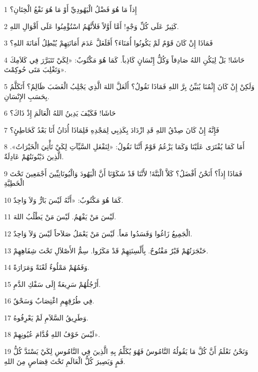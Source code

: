 \par 1 إِذاً مَا هُوَ فَضْلُ الْيَهُودِيِّ أَوْ مَا هُوَ نَفْعُ الْخِتَانِ؟
\par 2 كَثِيرٌ عَلَى كُلِّ وَجْهٍ! أَمَّا أَوَّلاً فَلأَنَّهُمُ اسْتُؤْمِنُوا عَلَى أَقْوَالِ اللهِ.
\par 3 فَمَاذَا إِنْ كَانَ قَوْمٌ لَمْ يَكُونُوا أُمَنَاءَ؟ أَفَلَعَلَّ عَدَمَ أَمَانَتِهِمْ يُبْطِلُ أَمَانَةَ اللهِ؟
\par 4 حَاشَا! بَلْ لِيَكُنِ اللهُ صَادِقاً وَكُلُّ إِنْسَانٍ كَاذِباً. كَمَا هُوَ مَكْتُوبٌ: «لِكَيْ تَتَبَرَّرَ فِي كَلاَمِكَ وَتَغْلِبَ مَتَى حُوكِمْتَ».
\par 5 وَلَكِنْ إِنْ كَانَ إِثْمُنَا يُبَيِّنُ بِرَّ اللهِ فَمَاذَا نَقُولُ؟ أَلَعَلَّ اللهَ الَّذِي يَجْلِبُ الْغَضَبَ ظَالِمٌ؟ أَتَكَلَّمُ بِحَسَبِ الإِنْسَانِ.
\par 6 حَاشَا! فَكَيْفَ يَدِينُ اللهُ الْعَالَمَ إِذْ ذَاكَ؟
\par 7 فَإِنَّهُ إِنْ كَانَ صِدْقُ اللهِ قَدِ ازْدَادَ بِكَذِبِي لِمَجْدِهِ فَلِمَاذَا أُدَانُ أَنَا بَعْدُ كَخَاطِئٍ؟
\par 8 أَمَا كَمَا يُفْتَرَى عَلَيْنَا وَكَمَا يَزْعُمُ قَوْمٌ أَنَّنَا نَقُولُ: «لِنَفْعَلِ السَّيِّآتِ لِكَيْ تَأْتِيَ الْخَيْرَاتُ». الَّذِينَ دَيْنُونَتُهُمْ عَادِلَةٌ.
\par 9 فَمَاذَا إِذاً؟ أَنَحْنُ أَفْضَلُ؟ كَلاَّ الْبَتَّةَ! لأَنَّنَا قَدْ شَكَوْنَا أَنَّ الْيَهُودَ وَالْيُونَانِيِّينَ أَجْمَعِينَ تَحْتَ الْخَطِيَّةِ
\par 10 كَمَا هُوَ مَكْتُوبٌ: «أَنَّهُ لَيْسَ بَارٌّ وَلاَ وَاحِدٌ.
\par 11 لَيْسَ مَنْ يَفْهَمُ. لَيْسَ مَنْ يَطْلُبُ اللهَ.
\par 12 الْجَمِيعُ زَاغُوا وَفَسَدُوا مَعاً. لَيْسَ مَنْ يَعْمَلُ صَلاَحاً لَيْسَ وَلاَ وَاحِدٌ.
\par 13 حَنْجَرَتُهُمْ قَبْرٌ مَفْتُوحٌ. بِأَلْسِنَتِهِمْ قَدْ مَكَرُوا. سِمُّ الأَصْلاَلِ تَحْتَ شِفَاهِهِمْ.
\par 14 وَفَمُهُمْ مَمْلُوءٌ لَعْنَةً وَمَرَارَةً.
\par 15 أَرْجُلُهُمْ سَرِيعَةٌ إِلَى سَفْكِ الدَّمِ.
\par 16 فِي طُرُقِهِمِ اغْتِصَابٌ وَسَحْقٌ.
\par 17 وَطَرِيقُ السَّلاَمِ لَمْ يَعْرِفُوهُ.
\par 18 لَيْسَ خَوْفُ اللهِ قُدَّامَ عُيُونِهِمْ».
\par 19 وَنَحْنُ نَعْلَمُ أَنَّ كُلَّ مَا يَقُولُهُ النَّامُوسُ فَهُوَ يُكَلِّمُ بِهِ الَّذِينَ فِي النَّامُوسِ لِكَيْ يَسْتَدَّ كُلُّ فَمٍ وَيَصِيرَ كُلُّ الْعَالَمِ تَحْتَ قِصَاصٍ مِنَ اللهِ.
